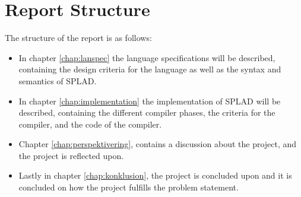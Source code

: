 \section{Report Structure}
The structure of the report is as follows:
\begin{itemize}
	\item In chapter \ref{chap:lanspec} the language specifications will be described, containing the design criteria for the language as well as the syntax and semantics of SPLAD.
	\item In chapter \ref{chap:implementation} the implementation of SPLAD will be described, containing the different compiler phases, the criteria for the compiler, and the code of the compiler.
	\item Chapter \ref{chap:perspektivering}, contains a discussion about the project, and the project is reflected upon. 
	\item Lastly in chapter \ref{chap:konklusion}, the project is concluded upon and it is concluded on how the project fulfills the problem statement.
\end{itemize}